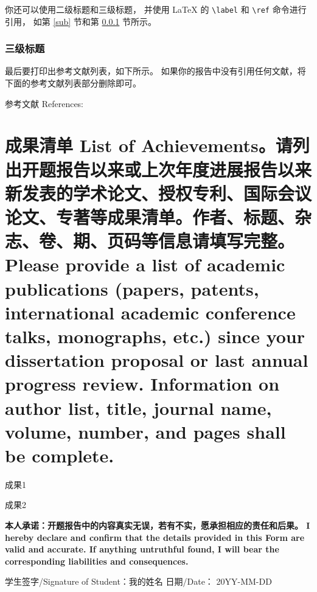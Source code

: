 \documentclass[a4paper,zihao=-4,AutoFakeBold]{ctexart}
\begin{document}
你还可以使用二级标题和三级标题，
并使用 \LaTeX{} 的 \verb|\label| 和 \verb|\ref| 命令进行引用，
如第 \ref{sub} 节和第 \ref{subsub} 节所示。



\subsubsection{三级标题}\label{subsub}

最后要打印出参考文献列表，如下所示。
如果你的报告中没有引用任何文献，将下面的参考文献列表部分删除即可。


\vspace{2\baselineskip}%
{%
    \linespread{1.25}\selectfont    %
    参考文献 References: 
    \printbibliography[heading=none]
}


\section{成果清单 List of Achievements。\mdseries 请列出开题报告以来或上次年度进展报告以来新发表的学术论文、授权专利、国际会议论文、专著等成果清单。作者、标题、杂志、卷、期、页码等信息请填写完整。Please provide a list of academic publications (papers, patents, international academic conference talks, monographs, etc.) since your dissertation proposal or last annual progress review. Information on author list, title, journal name, volume, number, and pages shall be complete.}

\begin{enumerate}[label={[\arabic*]}]
    \item 成果1
    \item 成果2
\end{enumerate}



\vspace{12pt}
\normalfont{}\bfseries\fangsong
本人承诺：开题报告中的内容真实无误，若有不实，愿承担相应的责任和后果。
I hereby declare and confirm that the details 
provided in this Form are valid and accurate. 
If anything untruthful found, 
I will bear the corresponding liabilities and consequences.

\vspace{\baselineskip}



\noindent
学生签字/Signature of Student：我的姓名
\hfill              
日期/Date： 20YY-MM-DD
\end{document}
